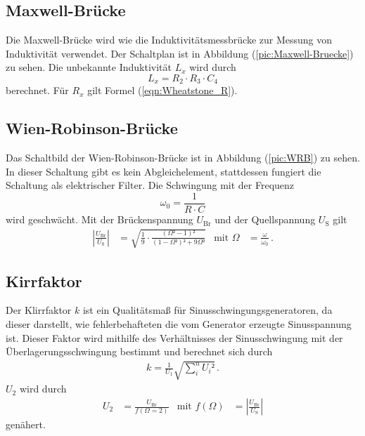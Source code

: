     \subsection{Maxwell-Brücke}
    Die Maxwell-Brücke wird wie die Induktivitätsmessbrücke zur Messung von Induktivität verwendet. Der Schaltplan ist in Abbildung (\ref{pic:Maxwell-Bruecke}) zu sehen. 
     Die unbekannte Induktivität $L_x$ wird durch 
    \begin{equation}
        \label{eqn:Induktivität_L_Maxwell}
        L_x = R_2 \cdot R_3 \cdot C_4 
    \end{equation}
    berechnet. Für $R_x$ gilt Formel (\ref{eqn:Wheatstone_R}). 
    \subsection{Wien-Robinson-Brücke}
    Das Schaltbild der Wien-Robinson-Brücke ist in Abbildung (\ref{pic:WRB}) zu sehen. In dieser Schaltung gibt es kein Abgleichelement, stattdessen fungiert die 
    Schaltung als elektrischer Filter. Die Schwingung mit der Frequenz 
    \begin{equation*}
        \omega_0 = \frac{1}{R \cdot C}
        \label{eqn:omega_0}
    \end{equation*}
   wird geschwächt. Mit der Brückenspannung $U_{\text{Br}}$ und der Quellspannung $U_{\text{S}}$ gilt
    \begin{align}
    \left| \frac{U_{\text{Br}}}{U_{\text{S}}}\right| &= \sqrt{\frac{1}{9} \cdot \frac{(\Omega² - 1)²}{(1-\Omega²)² + 9\Omega²}} & \text{mit} \,\, \Omega &= \frac{\omega}{\omega_0} \, .
    \label{eqn:Omega}
    \end{align}

    \subsection{Kirrfaktor}
    Der Klirrfaktor $k$ ist ein Qualitätsmaß für Sinusschwingungsgeneratoren, da dieser darstellt, wie fehlerbehafteten die vom Generator erzeugte Sinusspannung ist. 
    Dieser Faktor wird mithilfe des Verhältnisses der Sinusschwingung mit der Überlagerungsschwingung bestimmt und berechnet sich durch 
    \begin{align}
        k = \frac{1}{U_1} \sqrt{\sum_i ^n {{U_i}²}} \, .
    \label{eqn:Klirrfaktor}
    \end{align}
    $U_2$ wird durch 
    \begin{align}
        U_2 &= \frac{U_{\text{Br}}}{f(\Omega = 2)} & \text{mit} \,\, f(\Omega) &= \left| \frac{U_{\text{Br}}}{U_{\text{S}}}\right|
    \label{eqn:U_2}
    \end{align}
    genähert.
    

